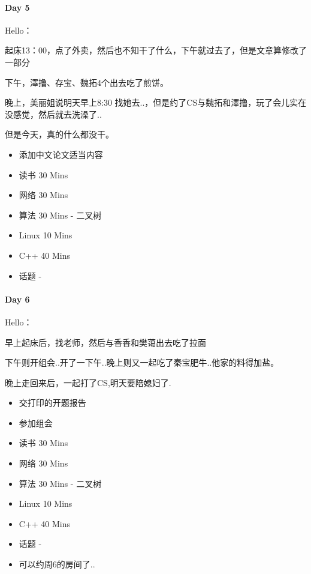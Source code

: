 \documentclass[UTF8,a4paper,8pt]{ctexart}
\begin{document}
	 \paragraph{Day 5       \quad     }
		 Hello：
		 
		 起床13：00，点了外卖，然后也不知干了什么，下午就过去了，但是文章算修改了一部分
		 
		 下午，澤撸、存宝、魏拓4个出去吃了煎饼。
		 
		 晚上，美丽姐说明天早上8:30 找她去..，但是约了CS与魏拓和澤撸，玩了会儿实在没感觉，然后就去洗澡了..
		 
		 但是今天，真的什么都没干。
		 \begin{itemize}
		 	\item  \makebox[0pt][l]{$\square$}\raisebox{.15ex}{\hspace{0.1em}$\checkmark$}添加中文论文适当内容
		 	
		 	\item  读书  30 Mins
		 	\item  网络  30 Mins		 	
		 	\item  算法  30 Mins	- 二叉树
		 	\item  Linux 10 Mins
		 	\item  C++   40 Mins
		 	
		 	\item  话题 - 
		 \end{itemize}
	 \paragraph{Day 6       \quad     }
		 Hello：
		 
		 早上起床后，找老师，然后与香香和樊蔼出去吃了拉面
		 
		 下午则开组会..开了一下午..晚上则又一起吃了秦宝肥牛..他家的料得加盐。
		 
		 晚上走回来后，一起打了CS,明天要陪媳妇了.
		  \begin{itemize}
		  	\item  \makebox[0pt][l]{$\square$}\raisebox{.15ex}{\hspace{0.1em}$\checkmark$}交打印的开题报告
		  	\item  \makebox[0pt][l]{$\square$}\raisebox{.15ex}{\hspace{0.1em}$\checkmark$}参加组会
		  	
		  	\item  读书  30 Mins
		  	\item  网络  30 Mins		 	
		  	\item  算法  30 Mins	- 二叉树
		  	\item  Linux 10 Mins
		  	\item  C++   40 Mins
		  	
		  	\item  话题 - 
		  	\item  \makebox[0pt][l]{$\square$}\raisebox{.15ex}{\hspace{0.1em}$\checkmark$}可以约周6的房间了..
		  \end{itemize}
\end{document}
